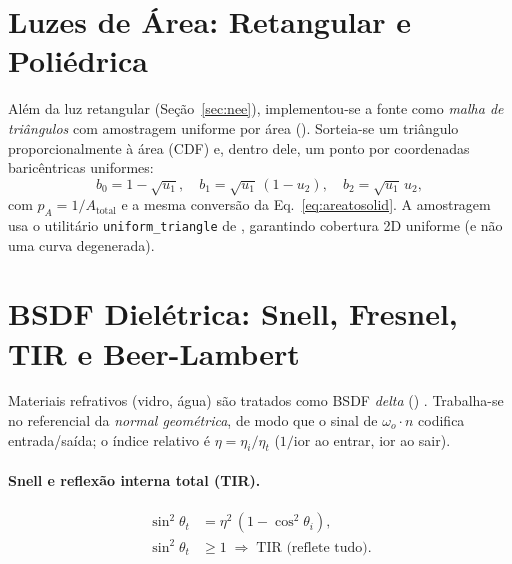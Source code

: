 \documentclass[portuguese]{sbcreviews-2025}%
\makeatletter
\newcommand{\pbrtcontentsurl}{https://pbr-book.org/4ed/contents.html}
\newcommand{\pbrtsectionurl}[1]{%
    \ifcsname pbrturl@#1\endcsname
        \csname pbrturl@#1\endcsname
    \else
        \pbrtcontentsurl
    \fi
}
\newcommand{\pbrtsec}[1]{\citep[\href{\pbrtsectionurl{#1}}{Se\c{c}\~ao~#1}]{pharr2023pbrt}}
\makeatother
\begin{document}
\section{Luzes de Área: Retangular e Poliédrica}
\label{sec:lights}

Além da luz retangular (Seção~\ref{sec:nee}), implementou-se a fonte como \emph{malha de
triângulos} com amostragem uniforme por área \pbrtsec{6.5}
(). Sorteia-se um triângulo proporcionalmente à
área (CDF) e, dentro dele, um ponto por coordenadas baricêntricas uniformes:
\begin{equation}
b_0 = 1-\sqrt{u_1}, \quad b_1=\sqrt{u_1}\,(1-u_2), \quad b_2=\sqrt{u_1}\,u_2 ,
\label{eq:baricentrica}
\end{equation}
com $p_A = 1/A_{\text{total}}$ e a mesma conversão da Eq.~\eqref{eq:areatosolid}. A
amostragem usa o utilitário \texttt{uniform\_triangle} de ,
garantindo cobertura 2D uniforme (e não uma curva degenerada).

\section{BSDF Dielétrica: Snell, Fresnel, TIR e Beer-Lambert}
\label{sec:dielectric}

Materiais refrativos (vidro, água) são tratados como BSDF \emph{delta}
() \pbrtsec{9.5}. Trabalha-se no referencial da
\emph{normal geométrica}, de modo que o sinal de $\omega_o\!\cdot\! n$ codifica entrada/saída;
o índice relativo é $\eta=\eta_i/\eta_t$ ($1/\text{ior}$ ao entrar, $\text{ior}$ ao sair).

\paragraph{Snell e reflexão interna total (TIR).}
\begin{align}
\sin^2\theta_t &= \eta^2\,(1-\cos^2\theta_i), \label{eq:snell}\\
\sin^2\theta_t &\ge 1 \;\Rightarrow\; \text{TIR (reflete tudo)}. \label{eq:tir}
\end{align}
\end{document}
